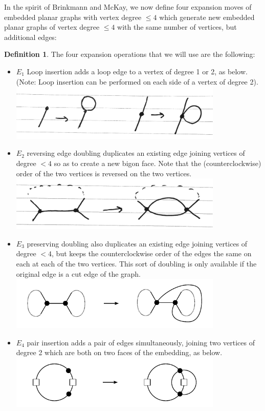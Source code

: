 \documentclass[amsmath,secnumarabic,floatfix,amssymb,nofootinbib,nobibnotes,letterpaper,11pt,tightenlines,showkeys]{revtex4}
\theoremstyle{definition}
\newtheorem{definition}[theorem]{Definition}
\newcommand{\loopinsert}{E_1}
\newcommand{\edgedouble}{E_2}
\newcommand{\cutedgedouble}{E_3}
\newcommand{\pairinsert}{E_4}
\begin{document}
In the spirit of Brinkmann and McKay, we now define four expansion moves of embedded planar graphs with vertex degree $\leq 4$ which generate new embedded planar graphs of vertex degree $\leq 4$ with the same number of vertices, but additional edges:
\begin{definition}
The four expansion operations that we will use are the following:
\begin{itemize}
\item $\loopinsert$ Loop insertion adds a loop edge to a vertex of degree 1 or 2, as below. (Note: Loop insertion can be performed on each side of a vertex of degree 2).\\
\includegraphics[width=4in]{loop-addition.png}
\item $\edgedouble$ reversing edge doubling duplicates an existing edge joining vertices of degree $< 4$ so as to create a new bigon face. Note that the (counterclockwise) order of the two vertices is reversed on the two vertices.\\
\includegraphics[width=4in]{edge-duplication-non-cut.png}
\item $\cutedgedouble$ preserving doubling also duplicates an existing edge joining vertices of degree $<4$, but 
keeps the counterclockwise order of the edges the same on each at each of the two vertices. This sort of doubling is only available if the original edge is a cut edge of the graph.\\
\includegraphics[width=4in]{edge-duplication-cut}
\item $\pairinsert$ pair insertion adds a pair of edges simultaneously, joining two vertices of degree 2 which are both on two faces of the embedding, as below.\\
\includegraphics[width=4in]{pair-insertion}
\end{itemize}
\end{definition}
\end{document}
